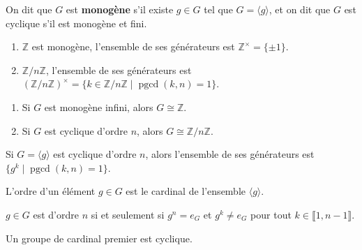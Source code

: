   \begin{definition}
    On dit que $G$ est \textbf{monogène} s'il existe $g \in G$ tel que $G = \langle g \rangle$, et on dit que $G$ est cyclique s'il est monogène et fini.
  \end{definition}

  \begin{example}
    \begin{enumerate}[label=(\roman*)]
      \item $\mathbb{Z}$ est monogène, l'ensemble de ses générateurs est $\mathbb{Z}^\times = \{ \pm 1 \}$.
      \item $\mathbb{Z}/n\mathbb{Z}$, l'ensemble de ses générateurs est $(\mathbb{Z}/n\mathbb{Z})^\times = \{ k \in \mathbb{Z}/n\mathbb{Z} \mid \operatorname{pgcd}(k,n) = 1 \}$.
    \end{enumerate}
  \end{example}

  \begin{theorem}
    \begin{enumerate}[label=(\roman*)]
      \item Si $G$ est monogène infini, alors $G \cong \mathbb{Z}$.
      \item Si $G$ est cyclique d'ordre $n$, alors $G \cong \mathbb{Z}/n\mathbb{Z}$.
    \end{enumerate}
  \end{theorem}

  \begin{corollary}
    Si $G = \langle g \rangle$ est cyclique d'ordre $n$, alors l'ensemble de ses générateurs est $\{ g^k \mid \operatorname{pgcd}(k,n) = 1 \}$.
  \end{corollary}


  \begin{definition}
    L'ordre d'un élément $g \in G$ est le cardinal de l'ensemble $\langle g \rangle$.
  \end{definition}

  \begin{remark}
    $g \in G$ est d'ordre $n$ si et seulement si $g^n = e_G$ et $g^k \neq e_G$ pour tout $k \in \llbracket 1,n-1 \rrbracket$.
  \end{remark}


  \begin{proposition}
    Un groupe de cardinal premier est cyclique.
  \end{proposition}

